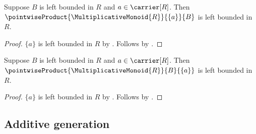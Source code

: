 \begin{corollary}\label{left_bounded_left_fixed_multiplication}
    Suppose $B$ is left bounded in $R$ and $a\in\carrier[R]$.
    Then $\pointwiseProduct{\MultiplicativeMonoid{R}}{\{a\}}{B}$ is left
        bounded in $R$.
\end{corollary}
\begin{proof}
    $\{a\}$ is left bounded in $R$ by .
    Follows by .
\end{proof}

\begin{corollary}\label{left_bounded_right_fixed_multiplication}
    Suppose $B$ is left bounded in $R$ and $a\in\carrier[R]$.
    Then $\pointwiseProduct{\MultiplicativeMonoid{R}}{B}{\{a\}}$ is left
        bounded in $R$.
\end{corollary}
\begin{proof}
    $\{a\}$ is left bounded in $R$ by .
    Follows by .
\end{proof}

\subsection{Additive generation}

